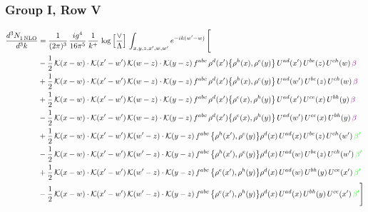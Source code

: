 \documentclass[9pt]{article}
\numberwithin{equation}{section}
\begin{document}
\subsubsection{Group I, Row V}
\begin{align}
    \frac{d^{3}N_{1\,\rm NLO}^{\rm}}{d^{3}k}  & = \frac{1}{(2\pi)^{3}}\, \frac{ig^{4}}{16\pi^{5}}\, \frac{1}{k^{+}}\, \log{\left[\frac{\vee}{\Lambda}\right]}\, \int_{x,y,z,x^{\prime},w,w^{\prime}}e^{-ik(w^{\prime}-w)}\, \Bigg[\notag \\ & -\frac{1}{2}\,\mathcal{K}(x-w)\cdot\mathcal{K}(x'-w')\,\mathcal{K}(w-z)\cdot\mathcal{K}(y-z)\, f^{abc}\,\rho^{d}(x')\big\{\rho^{h}(x),\rho^{e}(y)\big\}\,U^{ad}(x')\,U^{be}(z)\,U^{ch}(w)\,{\color{violet} \beta}\notag\\ & +\frac{1}{2}\,\mathcal{K}(x-w)\cdot\mathcal{K}(x'-w')\,\mathcal{K}(w-z)\cdot\mathcal{K}(y-z)\, f^{abc}\,\rho^{d}(x')\big\{\rho^{h}(x),\rho^{e}(y)\big\}\,U^{ad}(w')\,U^{be}(z)\,U^{ch}(w)\,{\color{violet} \beta}\notag\\ &+\frac{1}{2}\,\mathcal{K}(x-w)\cdot\mathcal{K}(x'-w')\,\mathcal{K}(w-z)\cdot\mathcal{K}(y-z)\, f^{abc}\,\rho^{d}(x')\big\{\rho^{e}(x),\rho^{h}(y)\big\}\,U^{ad}(x')\,U^{ce}(x)\,U^{bh}(y)\,{\color{violet} \beta}\notag\\ & -\frac{1}{2}\,\mathcal{K}(x-w)\cdot\mathcal{K}(x'-w')\,\mathcal{K}(w-z)\cdot\mathcal{K}(y-z)\, f^{abc}\,\rho^{d}(x')\big\{\rho^{e}(x),\rho^{h}(y)\big\}\,U^{ad}(w')\,U^{ce}(x)\,U^{bh}(y)\,{\color{violet} \beta}\notag\\ & +\frac{1}{2}\,\mathcal{K}(x-w)\cdot\mathcal{K}(x'-w')\,\mathcal{K}(w'-z)\cdot\mathcal{K}(y-z)\, f^{abc}\,\big\{\rho^{h}(x'),\rho^{e}(y)\big\}\rho^{d}(x)\,U^{ad}(x)\,U^{be}(z)\,U^{ch}(w')\,{\color{green} \beta'}\notag\\ &-\frac{1}{2}\,\mathcal{K}(x-w)\cdot\mathcal{K}(x'-w')\,\mathcal{K}(w'-z)\cdot\mathcal{K}(y-z)\, f^{abc}\,\big\{\rho^{h}(x'),\rho^{e}(y)\big\}\rho^{d}(x)\,U^{ad}(w)\,U^{be}(z)\,U^{ch}(w')\,{\color{green} \beta'}\notag\\ & +\frac{1}{2}\,\mathcal{K}(x-w)\cdot\mathcal{K}(x'-w')\,\mathcal{K}(w'-z)\cdot\mathcal{K}(y-z)\, f^{abc}\,\big\{\rho^{e}(x'),\rho^{h}(y)\big\}\rho^{d}(x)\,U^{ad}(w)\,U^{bh}(y)\,U^{ce}(x')\,{\color{green} \beta'}\notag\\ &-\frac{1}{2}\,\mathcal{K}(x-w)\cdot\mathcal{K}(x'-w')\,\mathcal{K}(w'-z)\cdot\mathcal{K}(y-z)\, f^{abc}\,\big\{\rho^{e}(x'),\rho^{h}(y)\big\}\rho^{d}(x)\,U^{ad}(x)\,U^{bh}(y)\,U^{ce}(x')\,{\color{green} \beta'} \Bigg]
\end{align}
\end{document}

